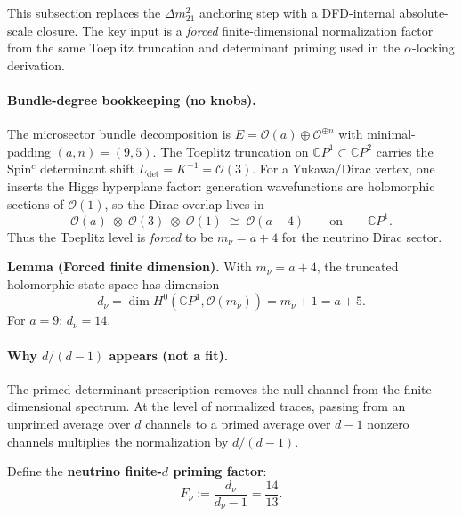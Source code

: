 This subsection replaces the $\Delta m^2_{21}$ anchoring step with a
DFD-internal absolute-scale closure. The key input is a \emph{forced} finite-dimensional
normalization factor from the same Toeplitz truncation and determinant priming used
in the $\alpha$-locking derivation.

\paragraph{Bundle-degree bookkeeping (no knobs).}
The microsector bundle decomposition is $E=\mathcal{O}(a)\oplus\mathcal{O}^{\oplus n}$ with minimal-padding
$(a,n)=(9,5)$.
The Toeplitz truncation on $\mathbb{C}P^1\subset\mathbb{C}P^2$ carries the Spin$^c$ determinant shift
$L_{\det}=K^{-1}=\mathcal{O}(3)$.
For a Yukawa/Dirac vertex, one inserts the Higgs hyperplane factor: generation
wavefunctions are holomorphic sections of $\mathcal{O}(1)$, so the Dirac overlap lives in
\begin{equation}
\mathcal{O}(a)\;\otimes\;\mathcal{O}(3)\;\otimes\;\mathcal{O}(1)\;\cong\;\mathcal{O}(a+4)
\qquad\text{on}\qquad \mathbb{C}P^1.
\end{equation}
Thus the Toeplitz level is \emph{forced} to be $m_\nu=a+4$ for the neutrino Dirac sector.

\begin{tcolorbox}[colback=blue!5!white, colframe=blue!60!black]
\textbf{Lemma (Forced finite dimension).}
With $m_\nu=a+4$, the truncated holomorphic state space has dimension
\begin{equation}
d_\nu = \dim H^0(\mathbb{C}P^1,\mathcal{O}(m_\nu)) = m_\nu+1 = a+5.
\end{equation}
For $a=9$: $\boxed{d_\nu=14}$.
\end{tcolorbox}

\paragraph{Why $d/(d-1)$ appears (not a fit).}
The primed determinant prescription removes the null channel from the finite-dimensional spectrum.
At the level of normalized traces, passing from an unprimed average over $d$ channels to a
primed average over $d-1$ nonzero channels multiplies the normalization by $d/(d-1)$.

Define the \textbf{neutrino finite-$d$ priming factor}:
\begin{equation}
F_\nu := \frac{d_\nu}{d_\nu-1} = \frac{14}{13}.
\end{equation}

